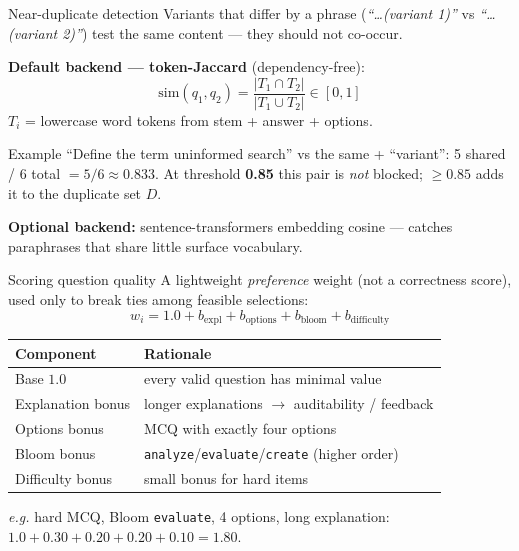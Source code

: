\documentclass[11pt,aspectratio=169]{beamer}
\newcommand{\code}[1]{\texttt{\small #1}}
\begin{document}
\begin{frame}{Near-duplicate detection}
  Variants that differ by a phrase (\emph{``…(variant 1)''} vs
  \emph{``…(variant 2)''}) test the same content — they should not co-occur.

  \vspace{1mm}
  \textbf{Default backend — token-Jaccard} (dependency-free):
  \[
    \mathrm{sim}(q_1,q_2)=\frac{|T_1 \cap T_2|}{|T_1 \cup T_2|}\in[0,1]
  \]
  $T_i$ = lowercase word tokens from stem + answer + options.

  \begin{block}{Example}
    ``Define the term uninformed search'' vs the same + ``variant'':
    5 shared / 6 total $=5/6\approx0.833$. At threshold \textbf{0.85} this pair
    is \emph{not} blocked; $\geq 0.85$ adds it to the duplicate set $D$.
  \end{block}

  \footnotesize\textbf{Optional backend:} sentence-transformers embedding cosine
  — catches paraphrases that share little surface vocabulary.
\end{frame}

\begin{frame}{Scoring question quality}
  A lightweight \emph{preference} weight (not a correctness score), used only to
  break ties among feasible selections:
  \[
    w_i = 1.0 + b_{\text{expl}} + b_{\text{options}} + b_{\text{bloom}} + b_{\text{difficulty}}
  \]
  \begin{center}\footnotesize
  \begin{tabular}{@{}ll@{}}
    \toprule
    \textbf{Component} & \textbf{Rationale} \\
    \midrule
    Base $1.0$ & every valid question has minimal value \\
    Explanation bonus & longer explanations $\to$ auditability / feedback \\
    Options bonus & MCQ with exactly four options \\
    Bloom bonus & \code{analyze}/\code{evaluate}/\code{create} (higher order) \\
    Difficulty bonus & small bonus for hard items \\
    \bottomrule
  \end{tabular}
  \end{center}
  \vspace{1mm}
  \footnotesize\emph{e.g.} hard MCQ, Bloom \code{evaluate}, 4 options, long
  explanation: $1.0+0.30+0.20+0.20+0.10=\mathbf{1.80}$.
\end{frame}
\end{document}
